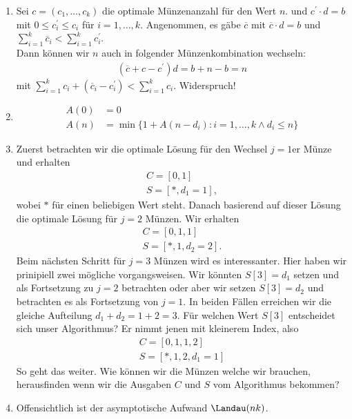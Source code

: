 

\begin{solution}

\phantom{}

\begin{enumerate}[label = \alph*)]

\item Sei $c = (c_1,\dots,c_k)$ die optimale Münzenanzahl für den Wert $n$.
und $c^{\prime}\cdot d = b$ mit $0 \leq c^{\prime}_i \leq c_i$ für $i=1,\dots,k$.
Angenommen, es gäbe $\overline{c}$ mit $\overline{c}\cdot d = b$ und
$\sum_{i=1}^k \overline{c}_i < \sum_{i=1}^k c^{\prime}_i$. \\
Dann können wir $n$ auch in folgender Münzenkombination wechseln:
\begin{align*}
  (\overline{c} + c - c^{\prime})d = b + n - b = n
\end{align*}
mit $\sum_{i=1}^k c_i + (\overline{c}_i - c^{\prime}_i) < \sum_{i=1}^k c_i$. Widerspruch!

\item
\begin{align*}
  A(0) &= 0 \\
  A(n) &= \min\{ 1 + A(n - d_i): i = 1,\dots,k \land d_i \leq n\}
\end{align*}

\item Zuerst betrachten wir die optimale Lösung für den Wechsel $j = 1$er Münze und erhalten 
\begin{align*}
	C = [0, 1] \\
	S = [\ast, d_1 = 1],
\end{align*}
wobei $\ast$ für einen beliebigen Wert steht. Danach basierend auf dieser Lösung die optimale Lösung für $j = 2$ Münzen. Wir erhalten
\begin{align*}
	C = [0,1,1]\\
	S = [\ast, 1, d_2 = 2].
\end{align*}
Beim nächsten Schritt für $j = 3$ Münzen wird es interessanter. Hier haben wir prinipiell zwei mögliche vorgangsweisen. Wir könnten $S[3] = d_1$ setzen und als Fortsetzung zu $j = 2$ betrachten oder aber wir setzen $S[3] = d_2$ und betrachten es als Fortsetzung von $j = 1$. In beiden Fällen erreichen wir die gleiche Aufteilung $d_1 + d_2 = 1 + 2 = 3$. Für welchen Wert $S[3]$ entscheidet sich unser Algorithmus? Er nimmt jenen mit kleinerem Index, also 
\begin{align*}
	C = [0, 1, 1, 2]\\
	S = [\ast, 1, 2, d_1 = 1]
\end{align*}
So geht das weiter. Wie können wir die Münzen welche wir brauchen, herausfinden wenn wir die Ausgaben $C$ und $S$ vom Algorithmus bekommen?

\item Offensichtlich ist der asymptotische Aufwand $\Landau(nk)$. 
\end{enumerate}

\end{solution}
